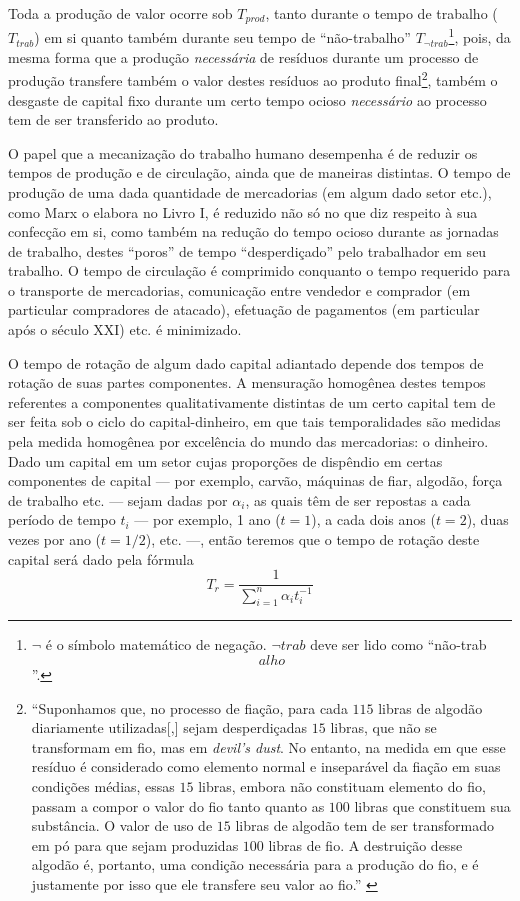 Toda a produção de valor ocorre sob $T_{prod}$, tanto durante o tempo de trabalho ($T_{trab}$) em si quanto também durante seu tempo de ``não-trabalho'' $T_{\lnot trab}$\footnote{$\lnot$ é o símbolo matemático de negação. $\lnot trab$ deve ser lido como ``não-trab\[alho\]''.}, pois, da mesma forma que a produção \textit{necessária} de resíduos durante um processo de produção transfere também o valor destes resíduos ao produto final\footnote{``Suponhamos que, no processo de fiação, para cada $115$ libras de algodão diariamente utilizadas[,] sejam desperdiçadas $15$ libras, que não se transformam em fio, mas em \textit{devil's dust}. No entanto, na medida em que esse resíduo é considerado como elemento normal e inseparável da fiação em suas condições médias, essas $15$ libras, embora não constituam elemento do fio, passam a compor o valor do fio tanto quanto as $100$ libras que constituem sua substância. O valor de uso de $15$ libras de algodão tem de ser transformado em pó para que sejam produzidas $100$ libras de fio. A destruição desse algodão é, portanto, uma condição necessária para a produção do fio, e é justamente por isso que ele transfere seu valor ao fio.'' \parencite[p. 282]{Marx2017}}, também o desgaste de capital fixo durante um certo tempo ocioso \textit{necessário} ao processo tem de ser transferido ao produto.

O papel que a mecanização do trabalho humano desempenha é de reduzir os tempos de produção e de circulação, ainda que de maneiras distintas. O tempo de produção de uma dada quantidade de mercadorias (em algum dado setor etc.), como Marx o elabora no Livro I, é reduzido não só no que diz respeito à sua confecção em si, como também na redução do tempo ocioso durante as jornadas de trabalho, destes ``poros'' de tempo ``desperdiçado'' pelo trabalhador em seu trabalho. O tempo de circulação é comprimido conquanto o tempo requerido para o transporte de mercadorias, comunicação entre vendedor e comprador (em particular compradores de atacado), efetuação de pagamentos (em particular após o século XXI) etc. é minimizado.

O tempo de rotação de algum dado capital adiantado depende dos tempos de rotação de suas partes componentes. A mensuração homogênea destes tempos referentes a componentes qualitativamente distintas de um certo capital tem de ser feita sob o ciclo do capital-dinheiro, em que tais temporalidades são medidas pela medida homogênea por excelência do mundo das mercadorias: o dinheiro. Dado um capital em um setor cujas proporções de dispêndio em certas componentes de capital — por exemplo, carvão, máquinas de fiar, algodão, força de trabalho etc. — sejam dadas por $\alpha_{i}$, as quais têm de ser repostas a cada período de tempo $t_{i}$ — por exemplo, 1 ano ($t=1$), a cada dois anos ($t=2$), duas vezes por ano ($t=1/2$), etc. —, então teremos que o tempo de rotação deste capital será dado pela fórmula
$$
T_{r}= \frac{1}{\sum \limits_{i=1}^{n} \alpha_{i} t_{i}^{-1}}
$$


